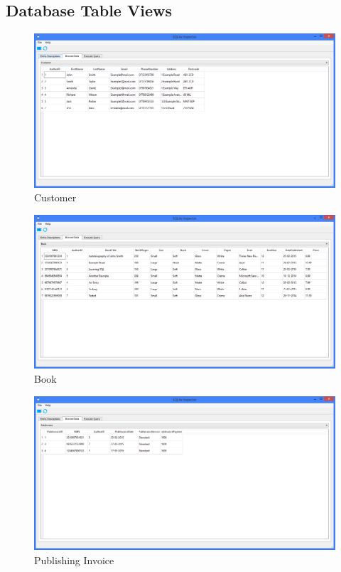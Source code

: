 \subsection{Database Table Views}

\begin{figure}[H]
    \caption{Customer} \label{fig:Customer}
    \includegraphics[width=\textwidth]{./Maintenance/DatabaseTables/Customer.png}
\end{figure}

\begin{figure}[H]
    \caption{Book} \label{fig:Book}
    \includegraphics[width=\textwidth]{./Maintenance/DatabaseTables/Book.png}
\end{figure}

\begin{figure}[H]
    \caption{Publishing Invoice} \label{fig:PubInvoice}
    \includegraphics[width=\textwidth]{./Maintenance/DatabaseTables/PubInvoice.png}
\end{figure}

